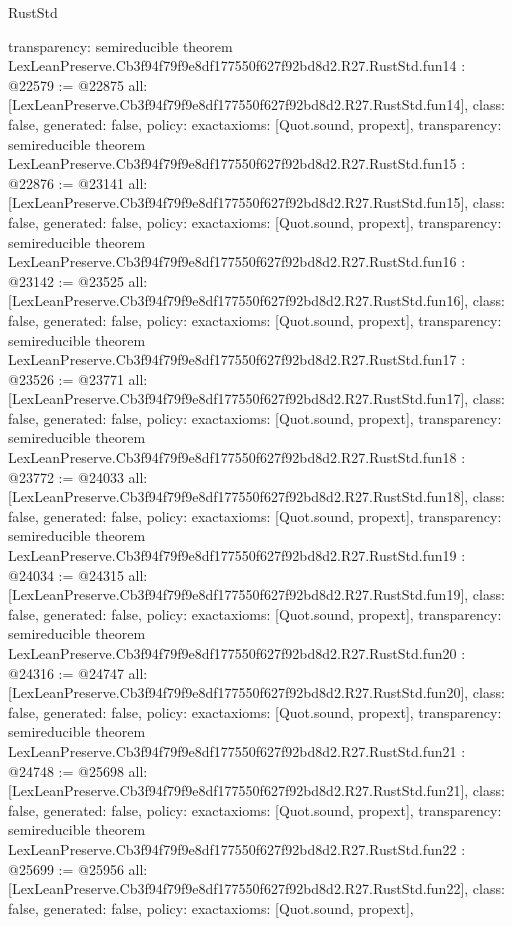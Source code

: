 \begin{lexlean}{RustStd}
\begin{coremodule}
{  transparency: semireducible
}
theorem LexLeanPreserve.Cb3f94f79f9e8df177550f627f92bd8d2.R27.RustStd.fun14 : @22579 := @22875 {
  all: [LexLeanPreserve.Cb3f94f79f9e8df177550f627f92bd8d2.R27.RustStd.fun14],
  class: false,
  generated: false,
  policy: exact{axioms: [Quot.sound, propext]},
  transparency: semireducible
}
theorem LexLeanPreserve.Cb3f94f79f9e8df177550f627f92bd8d2.R27.RustStd.fun15 : @22876 := @23141 {
  all: [LexLeanPreserve.Cb3f94f79f9e8df177550f627f92bd8d2.R27.RustStd.fun15],
  class: false,
  generated: false,
  policy: exact{axioms: [Quot.sound, propext]},
  transparency: semireducible
}
theorem LexLeanPreserve.Cb3f94f79f9e8df177550f627f92bd8d2.R27.RustStd.fun16 : @23142 := @23525 {
  all: [LexLeanPreserve.Cb3f94f79f9e8df177550f627f92bd8d2.R27.RustStd.fun16],
  class: false,
  generated: false,
  policy: exact{axioms: [Quot.sound, propext]},
  transparency: semireducible
}
theorem LexLeanPreserve.Cb3f94f79f9e8df177550f627f92bd8d2.R27.RustStd.fun17 : @23526 := @23771 {
  all: [LexLeanPreserve.Cb3f94f79f9e8df177550f627f92bd8d2.R27.RustStd.fun17],
  class: false,
  generated: false,
  policy: exact{axioms: [Quot.sound, propext]},
  transparency: semireducible
}
theorem LexLeanPreserve.Cb3f94f79f9e8df177550f627f92bd8d2.R27.RustStd.fun18 : @23772 := @24033 {
  all: [LexLeanPreserve.Cb3f94f79f9e8df177550f627f92bd8d2.R27.RustStd.fun18],
  class: false,
  generated: false,
  policy: exact{axioms: [Quot.sound, propext]},
  transparency: semireducible
}
theorem LexLeanPreserve.Cb3f94f79f9e8df177550f627f92bd8d2.R27.RustStd.fun19 : @24034 := @24315 {
  all: [LexLeanPreserve.Cb3f94f79f9e8df177550f627f92bd8d2.R27.RustStd.fun19],
  class: false,
  generated: false,
  policy: exact{axioms: [Quot.sound, propext]},
  transparency: semireducible
}
theorem LexLeanPreserve.Cb3f94f79f9e8df177550f627f92bd8d2.R27.RustStd.fun20 : @24316 := @24747 {
  all: [LexLeanPreserve.Cb3f94f79f9e8df177550f627f92bd8d2.R27.RustStd.fun20],
  class: false,
  generated: false,
  policy: exact{axioms: [Quot.sound, propext]},
  transparency: semireducible
}
theorem LexLeanPreserve.Cb3f94f79f9e8df177550f627f92bd8d2.R27.RustStd.fun21 : @24748 := @25698 {
  all: [LexLeanPreserve.Cb3f94f79f9e8df177550f627f92bd8d2.R27.RustStd.fun21],
  class: false,
  generated: false,
  policy: exact{axioms: [Quot.sound, propext]},
  transparency: semireducible
}
theorem LexLeanPreserve.Cb3f94f79f9e8df177550f627f92bd8d2.R27.RustStd.fun22 : @25699 := @25956 {
  all: [LexLeanPreserve.Cb3f94f79f9e8df177550f627f92bd8d2.R27.RustStd.fun22],
  class: false,
  generated: false,
  policy: exact{axioms: [Quot.sound, propext]},
}
\end{coremodule}
\end{lexlean}
